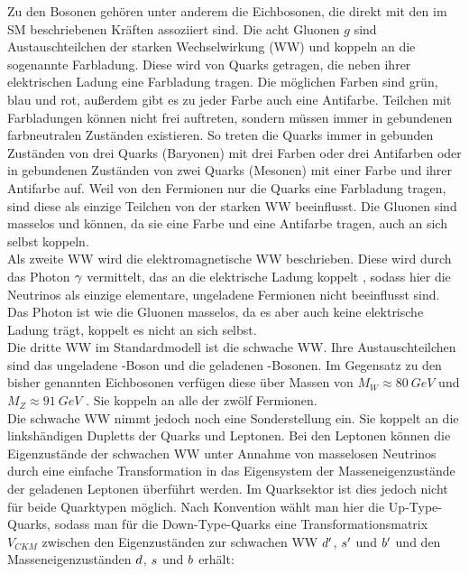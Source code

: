 Zu den Bosonen gehören unter anderem die Eichbosonen, die direkt mit den im SM beschriebenen Kräften assoziiert sind. Die acht Gluonen $g$ sind Austauschteilchen der starken Wechselwirkung (WW) und koppeln an die  sogenannte Farbladung. Diese wird von Quarks getragen, die neben ihrer elektrischen Ladung eine Farbladung tragen. Die möglichen Farben sind grün, blau und rot, außerdem gibt es zu jeder Farbe auch eine Antifarbe. Teilchen mit Farbladungen können nicht frei auftreten, sondern müssen immer in gebundenen farbneutralen Zuständen existieren. So treten die Quarks immer in gebunden Zuständen von drei Quarks (Baryonen) mit drei Farben oder drei Antifarben oder in gebundenen Zuständen von zwei Quarks (Mesonen) mit einer Farbe und ihrer Antifarbe auf. Weil von den Fermionen nur die Quarks eine Farbladung tragen, sind diese als einzige Teilchen von der starken WW beeinflusst. Die Gluonen sind masselos und können, da sie eine Farbe und eine Antifarbe tragen, auch an sich selbst koppeln.\\ 
Als zweite WW wird die elektromagnetische WW beschrieben. Diese wird durch das Photon ${\gamma}$ vermittelt, das an die elektrische Ladung koppelt , sodass hier die Neutrinos als einzige elementare, ungeladene Fermionen nicht beeinflusst sind. Das Photon ist wie die Gluonen masselos, da es aber auch keine elektrische Ladung trägt, koppelt es nicht an sich selbst.\\ 
Die dritte WW im Standardmodell ist die schwache WW. Ihre Austauschteilchen sind das ungeladene \Z-Boson und die geladenen \Wpm-Bosonen. Im Gegensatz zu den bisher genannten Eichbosonen verfügen diese über Massen von $M_W\approx\SI{80}{GeV}$ und $M_Z\approx\SI{91}{GeV}$ \cite{PDG-2012}. Sie koppeln an alle der zwölf Fermionen.\\ 
Die schwache WW nimmt jedoch noch eine Sonderstellung ein. Sie koppelt an die linkshändigen Dupletts der Quarks und Leptonen. Bei den Leptonen können die Eigenzustände der schwachen WW unter Annahme von masselosen Neutrinos durch eine einfache Transformation in das Eigensystem der Masseneigenzustände der geladenen Leptonen überführt werden. Im Quarksektor ist dies jedoch nicht für beide Quarktypen möglich. Nach Konvention wählt man hier die Up-Type-Quarks, sodass man für die Down-Type-Quarks eine Transformationsmatrix $V_{C\!K\!M}$ zwischen den Eigenzuständen zur schwachen WW ${d}'$, ${s}'$ und ${b}'$ und den Masseneigenzuständen ${d}$, ${s}$ und ${b}$ erhält:
